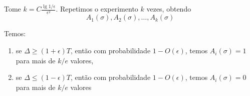 Tome $k=C\frac{\lg 1/\epsilon}{\epsilon^2}$. Repetimos o experimento $k$ vezes, obtendo
\[A_1(\sigma), A_2(\sigma),\dots,A_k(\sigma)\]

Temos:
\begin{enumerate}
\item se $\Delta \ge (1 + \epsilon)T$, ent\~ao com probabilidade $1-O(\epsilon)$, temos $A_i(\sigma) = 1$ para mais de $k/e$ valores,
\item se $\Delta \le (1 - \epsilon)T$, ent\~ao com probabilidade $1-O(\epsilon)$, temos $A_i(\sigma) = 0$ para mais de $k/e$ valores
\end{enumerate}

